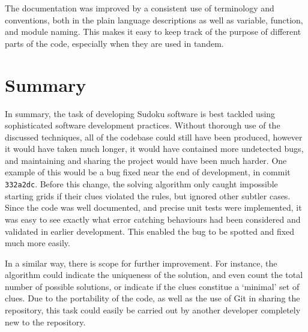 \documentclass[12pt]{article}
\begin{document}
The documentation was improved by a consistent use of terminology and conventions, both in the plain language descriptions as well as variable, function, and module naming.
This makes it easy to keep track of the purpose of different parts of the code, especially when they are used in tandem.

\section*{Summary}

In summary, the task of developing Sudoku software is best tackled using sophisticated software development practices.
Without thorough use of the discussed techniques, all of the codebase could still have been produced, however it would have taken much longer, it would have contained more undetected bugs, and maintaining and sharing the project would have been much harder.
One example of this would be a bug fixed near the end of development, in commit \texttt{332a2dc}.
Before this change, the solving algorithm only caught impossible starting grids if their clues violated the rules, but ignored other subtler cases.
Since the code was well documented, and precise unit tests were implemented, it was easy to see exactly what error catching behaviours had been considered and validated in earlier development.
This enabled the bug to be spotted and fixed much more easily.

In a similar way, there is scope for further improvement. For instance, the algorithm could indicate the uniqueness of the solution, and even count the total number of possible solutions, or indicate if the clues constitue a `minimal' set of clues.
Due to the portability of the code, as well as the use of Git in sharing the repository, this task could easily be carried out by another developer completely new to the repository.


\end{document}
